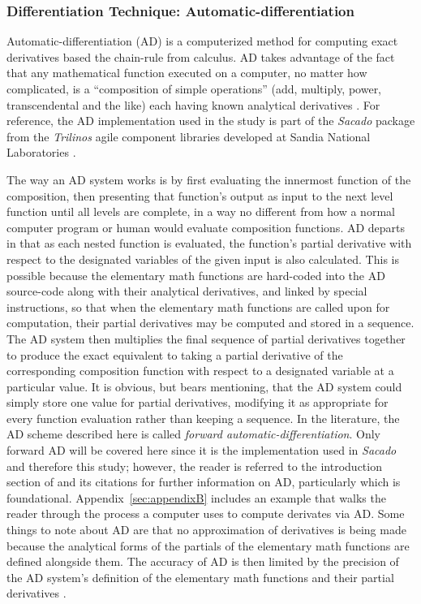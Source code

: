 \documentclass[preprint,12pt]{elsarticle}
\begin{document}
\subsubsection{Differentiation Technique: Automatic-differentiation} 
\label{ADsubsection}

Automatic-differentiation (AD) is a computerized method for computing exact derivatives based the chain-rule from calculus. AD takes advantage of the fact that any mathematical function executed on a computer, no matter how complicated, is a ``composition of simple operations'' (add, multiply, power, transcendental and the like) each having known analytical derivatives \cite{ref-sacado-presentation}. For reference, the AD implementation used in the study is part of the \emph{Sacado} package from the \emph{Trilinos} agile component libraries developed at Sandia National Laboratories \cite{ref-Sacado}.

The way an AD system works is by first evaluating the innermost function of the composition, then presenting that function's output as input to the next level function until all levels are complete, in a way no different from how a normal computer program or human would evaluate composition functions.  AD departs in that as each nested function is evaluated, the function's partial derivative with respect to the designated variables of the given input is also calculated.  This is possible because the elementary math functions are hard-coded into the AD source-code along with their analytical derivatives, and linked by special instructions, so that when the elementary math functions are called upon for computation, their partial derivatives may be computed and stored in a sequence. The AD system then multiplies the final sequence of partial derivatives together to produce the exact equivalent to taking a partial derivative of the corresponding composition function with respect to a designated variable at a particular value. It is obvious, but bears mentioning, that the AD system could simply store one value for partial derivatives, modifying it as appropriate for every function evaluation rather than keeping a sequence.  In the literature, the AD scheme described here is called \emph{forward automatic-differentiation}. Only forward AD will be covered here since it is the implementation used in \emph{Sacado} and therefore this study; however, the reader is referred to the introduction section of \cite{ref-AD-methods} and its citations for further information on AD, particularly \cite{ref-on-AD} which is foundational. Appendix~\ref{sec:appendixB} includes an example that walks the reader through the process a computer uses to compute derivates via AD.  Some things to note about AD are that no approximation of derivatives is being made because the analytical forms of the partials of the elementary math functions are defined alongside them. The accuracy of AD is then limited by the precision of the AD system's definition of the elementary math functions and their partial derivatives .
 
\end{document}
